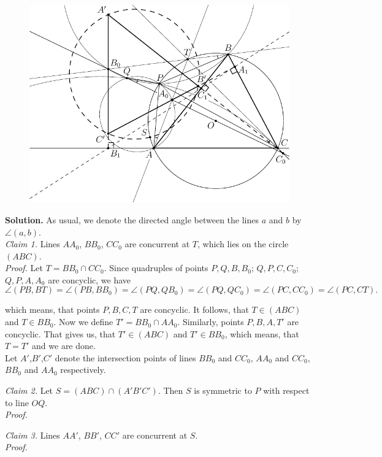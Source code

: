 \documentclass[12pt]{extarticle}
\begin{document}
\begin{figure}[H]
\centering
\includegraphics[width=14cm]{./fig.pdf}
\end{figure}

\textbf{Solution.} As usual, we denote the directed angle between the 
lines \(a\) and \(b\) by \(\angle(a,b)\). \\

\noindent \textit{Claim 1.} Lines \(AA_0\), \(BB_0\), \(CC_0\) are concurrent at 
\(T\), which lies on the circle \((ABC)\).\\

\noindent \textit{Proof.} Let \(T = BB_0 \cap CC_0\). Since quadruples of 
points \(P, Q, B, B_0\); \(Q, P, C, C_0\); \(Q, P, A, A_0\) are concyclic, 
we have 
\[
\angle(PB,BT) = \angle(PB,BB_0) = \angle(PQ,QB_0) = \angle(PQ,QC_0) 
= \angle(PC,CC_0) = \angle(PC,CT)
.\] 

which means, that points
\(P,B,C,T\) are concyclic. It follows, that \(T \in (ABC)\) and 
\(T \in BB_0\). Now we define \(T' = BB_0 \cap AA_0\). 
Similarly, points \(P,B,A,T'\) are concyclic. That gives us, 
that \(T' \in (ABC)\) and \(T' \in BB_0\), which means, that \(T=T'\) and 
we are done. \square \\

Let \(A'\),\(B'\),\(C'\) denote the intersection points of lines 
\(BB_0\) and \(CC_0\), \(AA_0\) and \(CC_0\), \(BB_0\) and \(AA_0\) 
respectively.

\noindent \textit{Claim 2.} Let \(S = (ABC) \cap (A'B'C')\). Then \(S\) 
is symmetric to \(P\) with respect to line \(OQ\).\\

\noindent \textit{Proof.} \square

\noindent \textit{Claim 3.} Lines \(AA'\), \(BB'\), \(CC'\) are 
concurrent at \(S\).\\

\noindent \textit{Proof.} \square
\end{document}
